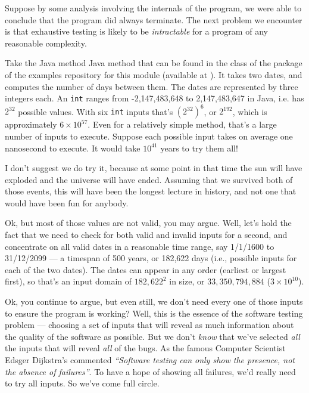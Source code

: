 Suppose by some analysis involving the internals of the program, we were able to
conclude that the program did always terminate. The next problem we encounter is
that exhaustive testing is likely to be {\it intractable} for a program of any
reasonable complexity. 


Take the Java method \daysbetweentwodatesmethod Java method that can be found in
the \calendarclass class of the \examplespackage package of the examples
repository for this module (available at \examplesrepourl). It takes two dates,
and computes the number of days between them. The dates are represented by three
integers each. An {\tt int} ranges from -2,147,483,648 to 2,147,483,647 in Java,
i.e. has $2^{32}$ possible values. With six {\tt int} inputs that's
${(2^{32})}^6$, or $2^{192}$, which is approximately $6 \times {10}^{57}$. Even
for a relatively simple method, that's a large number of inputs to execute.
Suppose each possible input takes on average one nanosecond to execute. It would
take ${10}^{41}$ years to try them all!

I don't suggest we do try it, because at some point in that time the sun will
have exploded and the universe will have ended. Assuming that we survived both
of those events, this will have been the longest lecture in history, and not one
that would have been fun for anybody.

Ok, but most of those values are not valid, you may argue. Well, let's hold the
fact that we need to check for both valid and invalid inputs for a second, and
concentrate on all valid dates in a reasonable time range, say 1/1/1600 to
31/12/2099 --- a timespan of 500 years, or 182,622 days (i.e., possible inputs
for each of the two dates). The dates can appear in any order (earliest or
largest first), so that's an input domain of ${182,622}^2$ in size, or
$33,350,794,884$ ($3 \times {10}^{10}$).



Ok, you continue to argue, but even still, we don't need every one of those
inputs to ensure the program is working? Well, this is the essence of the
software testing problem --- choosing a set of inputs that will reveal as much
information about the quality of the software as possible. But we don't {\it
know} that we've selected {\it all} the inputs that will reveal {\it all} of the
bugs. As the famous Computer Scientist Edsger Dijkstra's commented {\it
``Software testing can only show the presence, not the absence of failures''}.
To have a hope of showing all failures, we'd really need to try all inputs. So
we've come full circle. 

